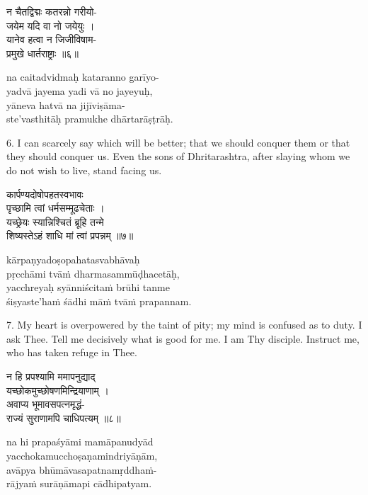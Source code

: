\begin{gitaverse}
न चैतद्विद्मः कतरन्नो गरीयो- \\
\tab जयेम यदि वा नो जयेयुः । \\
यानेव हत्वा न जिजीविषाम- \\
\tab प्रमुखे धार्तराष्ट्राः ॥६॥
\end{gitaverse}

\begin{transliteration}
na caitadvidmaḥ kataranno garīyo- \\
\tab yadvā jayema yadi vā no jayeyuḥ, \\
yāneva hatvā na jijīviṣāma- \\
\tab ste'vasthitāḥ pramukhe dhārtarāṣṭrāḥ.
\end{transliteration}

6. I can scarcely say which will be better; that we should conquer them or that
they should conquer us. Even the sons of Dhritarashtra, after slaying whom we
do not wish to live, stand facing us.

\begin{gitaverse}
कार्पण्यदोषोपहतस्वभावः \\
\tab पृच्छामि त्वां धर्मसम्मूढचेताः । \\
यच्छ्रेयः स्यान्निश्चितं ब्रूहि तन्मे \\
\tab शिष्यस्तेऽहं शाधि मां त्वां प्रपन्नम् ॥७॥
\end{gitaverse}

\begin{transliteration}
kārpaṇyadoṣopahatasvabhāvaḥ \\
\tab pṛcchāmi tvāṁ dharmasammūḍhacetāḥ, \\
yacchreyaḥ syānniścitaṁ brūhi tanme \\
\tab śiṣyaste'haṁ śādhi māṁ tvāṁ prapannam.
\end{transliteration}

7. My heart is overpowered by the taint of pity; my mind is confused as to
duty. I ask Thee. Tell me decisively what is good for me. I am Thy disciple.
Instruct me, who has taken refuge in Thee.

\begin{gitaverse}
न हि प्रपश्यामि ममापनुद्याद् \\
\tab यच्छोकमुच्छोषणमिन्द्रियाणाम् । \\
अवाप्य भूमावसपत्नमृद्धं- \\
\tab राज्यं सुराणामपि चाधिपत्यम् ॥८॥
\end{gitaverse}

\begin{transliteration}
na hi prapaśyāmi mamāpanudyād \\
\tab yacchokamucchoṣaṇamindriyāṇām, \\
avāpya bhūmāvasapatnamṛddhaṁ- \\
\tab rājyaṁ surāṇāmapi cādhipatyam.
\end{transliteration}

